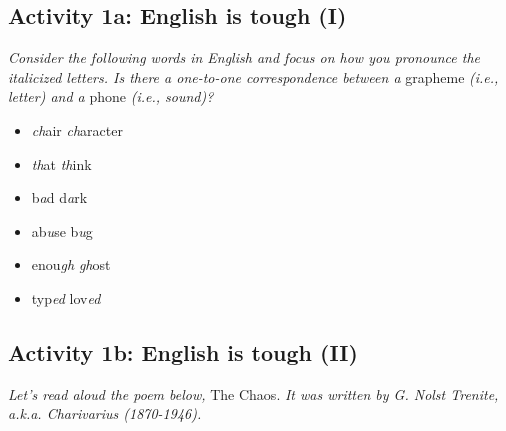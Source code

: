 \documentclass[11pt, oneside]{article}   	%
\begin{document}
\newpage

\subsection{Activity 1a: English is tough (I)}

{\itshape Consider the following words in English and focus on how you pronounce the italicized letters. Is there a one-to-one correspondence between a} grapheme {\itshape (i.e., letter) and a} phone {\itshape (i.e., sound)?}

\parbox{.5\textwidth}{%
    \begin{itemize}
	\item[] {\itshape ch}air \hfill {\itshape ch}aracter
	\item[] {\itshape th}at \hfill {\itshape th}ink
	\item[] b{\itshape a}d \hfill d{\itshape a}rk
	\item[] ab{\itshape u}se \hfill b{\itshape u}g
	\item[] enou{\itshape gh} \hfill {\itshape gh}ost
	\item[] typ{\itshape ed} \hfill lov{\itshape ed}
    \end{itemize}
}

\subsection{Activity 1b: English is tough (II)}

{\itshape Let's read aloud the poem below,} The Chaos. {\itshape It was written by G. Nolst Trenite, a.k.a. Charivarius (1870-1946).}
\end{document}
